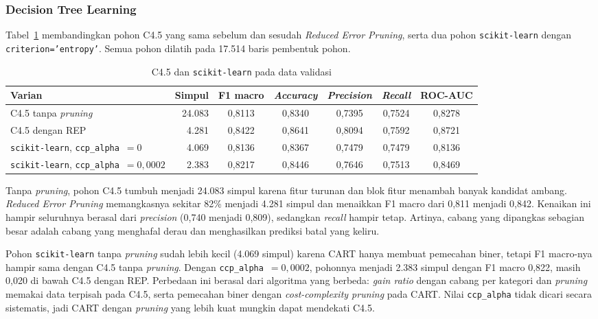 \subsubsection{Decision Tree Learning}

Tabel~\ref{tab:dtl} membandingkan pohon C4.5 yang sama sebelum dan sesudah
\textit{Reduced Error Pruning}, serta dua pohon \texttt{scikit-learn} dengan
\texttt{criterion='entropy'}. Semua pohon dilatih pada 17.514 baris
pembentuk pohon.

\begin{table}[H]
\centering
\small
\caption{C4.5 dan \texttt{scikit-learn} pada data validasi}
\label{tab:dtl}
\setlength{\tabcolsep}{4pt}
\begin{tabular}{@{}lrccccc@{}}
\toprule
Varian & Simpul & F1 macro & \textit{Accuracy} & \textit{Precision} & \textit{Recall} & ROC-AUC \\
\midrule
C4.5 tanpa \textit{pruning} & 24.083 & 0,8113 & 0,8340 & 0,7395 & 0,7524 & 0,8278 \\
C4.5 dengan REP & 4.281 & 0,8422 & 0,8641 & 0,8094 & 0,7592 & 0,8721 \\
\texttt{scikit-learn}, \texttt{ccp\_alpha}~$=0$ & 4.069 & 0,8136 & 0,8367 & 0,7479 & 0,7479 & 0,8136 \\
\texttt{scikit-learn}, \texttt{ccp\_alpha}~$=0{,}0002$ & 2.383 & 0,8217 & 0,8446 & 0,7646 & 0,7513 & 0,8469 \\
\bottomrule
\end{tabular}
\end{table}

Tanpa \textit{pruning}, pohon C4.5 tumbuh menjadi 24.083 simpul karena fitur
turunan dan blok fitur menambah banyak kandidat ambang. \textit{Reduced Error
Pruning} memangkasnya sekitar 82\% menjadi 4.281 simpul dan menaikkan F1
macro dari 0,811 menjadi 0,842. Kenaikan ini hampir seluruhnya berasal dari
\textit{precision} (0,740 menjadi 0,809), sedangkan \textit{recall} hampir
tetap. Artinya, cabang yang dipangkas sebagian besar adalah cabang yang
menghafal derau dan menghasilkan prediksi batal yang keliru.

Pohon \texttt{scikit-learn} tanpa \textit{pruning} sudah lebih kecil (4.069
simpul) karena CART hanya membuat pemecahan biner, tetapi F1 macro-nya
hampir sama dengan C4.5 tanpa \textit{pruning}. Dengan
\texttt{ccp\_alpha}~$=0{,}0002$, pohonnya menjadi 2.383 simpul dengan F1
macro 0,822, masih 0,020 di bawah C4.5 dengan REP. Perbedaan ini berasal
dari algoritma yang berbeda: \textit{gain ratio} dengan cabang per kategori
dan \textit{pruning} memakai data terpisah pada C4.5, serta pemecahan biner
dengan \textit{cost-complexity pruning} pada CART. Nilai \texttt{ccp\_alpha}
tidak dicari secara sistematis, jadi CART dengan \textit{pruning} yang lebih
kuat mungkin dapat mendekati C4.5.


